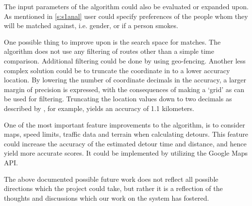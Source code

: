 The input parameters of the algorithm could also be evaluated or expanded upon.
As mentioned in \ref{s:s1anal} user could specify preferences of the people whom they will be matched against, i.e. gender, or if a person smokes.

One possible thing to improve upon is the search space for matches.
The algorithm does not use any filtering of routes other than a simple time comparison.
Additional filtering could be done by using geo-fencing.
Another less complex solution could be to truncate the coordinate in to a lower accuracy location.
By lowering the number of coordinate decimals in the accuracy, a larger margin of precision is expressed, with the consequences of making a `grid' as can be used for filtering.
Truncating the location values down to two decimals as described by \citet{gpsdecimal}, for example, yields an accuracy of 1.1 kilometers.

One of the most important feature improvements to the algorithm, is to consider maps, speed limits, traffic data and terrain when calculating detours.
This feature could increase the accuracy of the estimated detour time and distance, and hence yield more accurate scores.
It could be implemented by utilizing the Google Maps API.

The above documented possible future work does not reflect all possible directions which the project could take, but rather it is a reflection of the thoughts and discussions which our work on the system has fostered.